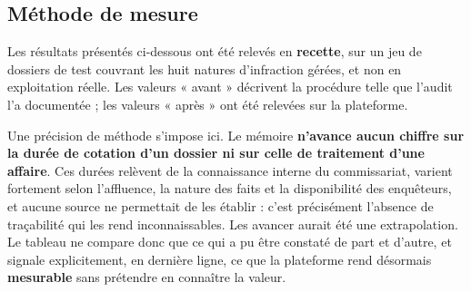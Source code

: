 \subsection{Méthode de mesure}

Les résultats présentés ci-dessous ont été relevés en \textbf{recette}, sur un jeu de dossiers de test couvrant les huit natures d'infraction gérées, et non en exploitation réelle. Les valeurs « avant » décrivent la procédure telle que l'audit l'a documentée ; les valeurs « après » ont été relevées sur la plateforme.

Une précision de méthode s'impose ici. Le mémoire \textbf{n'avance aucun chiffre sur la durée de cotation d'un dossier ni sur celle de traitement d'une affaire}. Ces durées relèvent de la connaissance interne du commissariat, varient fortement selon l'affluence, la nature des faits et la disponibilité des enquêteurs, et aucune source ne permettait de les établir : c'est précisément l'absence de traçabilité qui les rend inconnaissables. Les avancer aurait été une extrapolation. Le tableau ne compare donc que ce qui a pu être constaté de part et d'autre, et signale explicitement, en dernière ligne, ce que la plateforme rend désormais \textbf{mesurable} sans prétendre en connaître la valeur.

